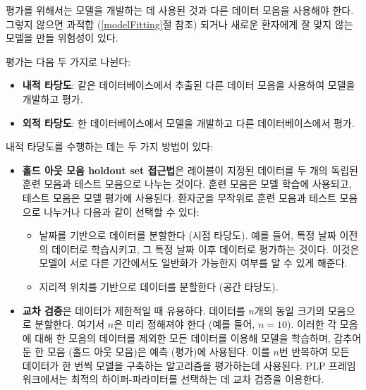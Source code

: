 \documentclass[10.5pt]{book}
\providecommand{\tightlist}{%
  \setlength{\itemsep}{0pt}\setlength{\parskip}{0pt}}
\theoremstyle{definition}
\theoremstyle{definition}
\theoremstyle{definition}
\theoremstyle{remark}
\let\BeginKnitrBlock\begin \let\EndKnitrBlock\end
\begin{document}
\BeginKnitrBlock{rmdimportant}
평가를 위해서는 모델을 개발하는 데 사용된 것과 다른 데이터 모음을
사용해야 한다. 그렇지 않으면 과적합 (\ref{modelFitting}절 참조) 되거나
새로운 환자에게 잘 맞지 않는 모델을 만들 위험성이 있다.
\EndKnitrBlock{rmdimportant}

평가는 다음 두 가지로 나뉜다:

\begin{itemize}
\tightlist
\item
  \textbf{내적 타당도}: 같은 데이터베이스에서 추출된 다른 데이터 모음을
  사용하여 모델을 개발하고 평가.
\item
  \textbf{외적 타당도}: 한 데이터베이스에서 모델을 개발하고 다른
  데이터베이스에서 평가. 
\end{itemize}

내적 타당도를 수행하는 데는 두 가지 방법이 있다:

\begin{itemize}
\tightlist
\item
  \textbf{홀드 아웃 모음 holdout set 접근법}은 레이블이 지정된 데이터를
  두 개의 독립된 훈련 모음과 테스트 모음으로 나누는 것이다. 훈련 모음은
  모델 학습에 사용되고, 테스트 모음은 모델 평가에 사용된다. 환자군을
  무작위로 훈련 모음과 테스트 모음으로 나누거나 다음과 같이 선택할 수
  있다:

  \begin{itemize}
  \tightlist
  \item
    날짜를 기반으로 데이터를 분할한다 (시점 타당도). 예를 들어, 특정
    날짜 이전의 데이터로 학습시키고, 그 특정 날짜 이후 데이터로 평가하는
    것이다. 이것은 모델이 서로 다른 기간에서도 일반화가 가능한지 여부를
    알 수 있게 해준다. 
  \item
    지리적 위치를 기반으로 데이터를 분할한다 (공간 타당도).
  \end{itemize}
\item
  \textbf{교차 검증}은 데이터가 제한적일 때 유용하다. 데이터를 \(n\)개의
  동일 크기의 모음으로 분할한다. 여기서 \(n\)은 미리 정해져야 한다 (예를
  들어, \(n=10\)). 이러한 각 모음에 대해 한 모음의 데이터를 제외한 모든
  데이터를 이용해 모델을 학습하며, 감추어 둔 한 모음 (홀드 아웃 모음)은
  예측 (평가)에 사용된다. 이를 \(n\)번 반복하여 모든 데이터가 한 번씩
  모델을 구축하는 알고리즘을 평가하는데 사용된다. PLP 프레임 워크에서는
  최적의 하이퍼-파라미터를 선택하는 데 교차 검증을 이용한다.
\end{itemize}
\end{document}
